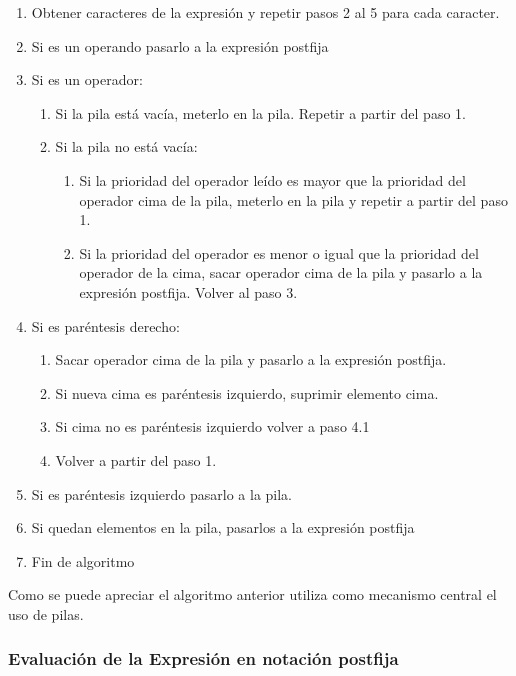 \begin{enumerate}
	\item Obtener caracteres de la expresión y repetir pasos 2 al 5 para cada caracter.
	\item Si es un operando pasarlo a la expresión postfija
	\item Si es un operador:
	\begin{enumerate}
		\item Si la pila está vacía, meterlo en la pila. Repetir a partir del paso 1.
		\item Si la pila no está vacía:
		\begin{enumerate}
			\item Si la prioridad del operador leído es mayor que la prioridad del operador	cima de la pila, meterlo en la pila y repetir a partir del paso 1.
			\item Si la prioridad del operador es menor o igual que la prioridad del operador de la cima, sacar operador cima de la pila y pasarlo a la expresión postfija. Volver al paso 3.	
		\end{enumerate}
	\end{enumerate}
	\item Si es paréntesis derecho:
	\begin{enumerate}		
		\item Sacar operador cima de la pila y pasarlo a la expresión postfija.
		\item Si nueva cima es paréntesis izquierdo, suprimir elemento cima.
		\item Si cima no es paréntesis izquierdo volver a paso 4.1
		\item Volver a partir del paso 1.
	\end{enumerate}
	\item Si es paréntesis izquierdo pasarlo a la pila. 
	\item Si quedan elementos en la pila, pasarlos a la expresión postfija
	\item Fin de algoritmo
\end{enumerate}

Como se puede apreciar el algoritmo anterior utiliza como mecanismo central el uso de pilas.

\subsubsection{Evaluación de la Expresión en notación postfija}

